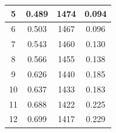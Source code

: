 \documentclass[a4paper,12pt]{article}
\begin{document}
\begin{table}[H]
\begin{subtable}[t]{0.32\textwidth}
\begin{tabular}{|c|c|c|c|}
				5                                                            & 0.489                                                                           & 1474                                                                 & 0.094                                                                \\ \hline
				6                                                            & 0.503                                                                           & 1467                                                                 & 0.096                                                                \\ \hline
				7                                                            & 0.543                                                                           & 1460                                                                 & 0.130                                                                \\ \hline
				8                                                            & 0.566                                                                           & 1455                                                                 & 0.138                                                                \\ \hline
				9                                                            & 0.626                                                                           & 1440                                                                 & 0.185                                                                \\ \hline
				10                                                           & 0.637                                                                           & 1433                                                                 & 0.183                                                                \\ \hline
				11                                                           & 0.688                                                                           & 1422                                                                 & 0.225                                                                \\ \hline
				12                                                           & 0.699                                                                           & 1417                                                                 & 0.229                                                                \\ \hline

\end{tabular}
\end{subtable}
\end{table}
\end{document}
